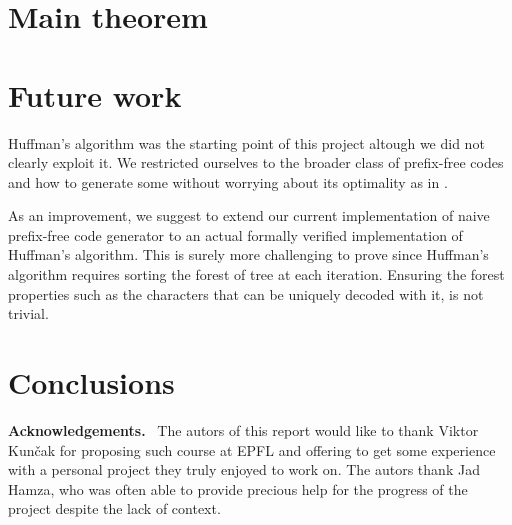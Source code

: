 \documentclass[a4paper,UKenglish,cleveref, autoref, thm-restate]{lipics-v2021}
\begin{document}
\section{Main theorem}

\section{Future work}

Huffman's algorithm was the starting point of this project altough we did not clearly exploit it. We restricted ourselves to the broader class of prefix-free codes and how to generate some without worrying about its optimality as in \cite{blanchette}. 

As an improvement, we suggest to extend our current implementation of naive prefix-free code generator to an actual formally verified implementation of Huffman's algorithm. This is surely more challenging to prove since Huffman's algorithm requires sorting the forest of tree at each iteration. Ensuring the forest properties such as the characters that can be uniquely decoded with it, is not trivial.

\section{Conclusions}


\vspace{0.5cm} %
\noindent %
\textbf{\large Acknowledgements.}\ %
The autors of this report would like to thank Viktor Kun\v{c}ak for proposing such course at EPFL and offering to get some experience with a personal project they truly enjoyed to work on. The autors thank Jad Hamza, who was often able to provide precious help for the progress of the project despite the lack of context.


\end{document}
